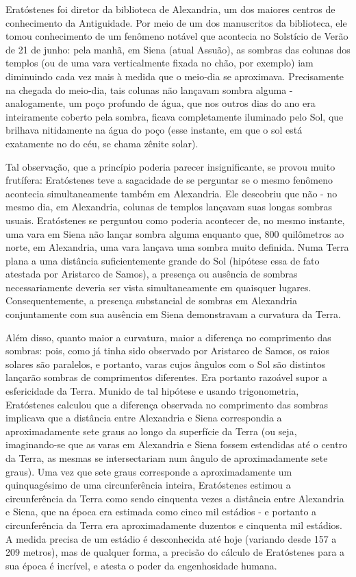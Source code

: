 Eratóstenes foi diretor da biblioteca de Alexandria, um dos maiores centros de conhecimento da Antiguidade. Por meio de um dos manuscritos da biblioteca, ele tomou conhecimento de um fenômeno notável que acontecia no Solstício de Verão de 21 de junho: pela manhã, em Siena (atual Assuão), as sombras das colunas dos templos (ou de uma vara verticalmente fixada no chão, por exemplo) iam diminuindo cada vez mais à medida que o meio-dia se aproximava. Precisamente na chegada do meio-dia, tais colunas não lançavam sombra alguma - analogamente, um poço profundo de água, que nos outros dias do ano era inteiramente coberto pela sombra, ficava completamente iluminado pelo Sol, que brilhava nitidamente na água do poço (esse instante, em que o sol está exatamente no  do céu, se chama zênite solar). \par 
Tal observação, que a princípio poderia parecer insignificante, se provou muito frutífera: Eratóstenes teve a sagacidade de se perguntar se o mesmo fenômeno acontecia simultaneamente também em Alexandria. Ele descobriu que não - no mesmo dia, em Alexandria, colunas de templos lançavam suas longas sombras usuais. Eratóstenes se perguntou como poderia acontecer de, no mesmo instante, uma vara em Siena não lançar sombra alguma enquanto que, 800 quilômetros ao norte, em Alexandria, uma vara lançava uma sombra muito definida. Numa Terra plana a uma distância suficientemente grande do Sol (hipótese essa de fato atestada por Aristarco de Samos), a presença ou ausência de sombras necessariamente deveria ser vista simultaneamente em quaisquer lugares. Consequentemente, a presença substancial de sombras em Alexandria conjuntamente com sua ausência em Siena demonstravam a curvatura da Terra. \par 
Além disso, quanto maior a curvatura, maior a diferença no comprimento das sombras: pois, como já tinha sido observado por Aristarco de Samos, os raios solares são paralelos, e portanto, varas cujos ângulos com o Sol são distintos lançarão sombras de comprimentos diferentes. Era portanto razoável supor a esfericidade da Terra. Munido de tal hipótese e usando trigonometria, Eratóstenes calculou que a diferença observada no comprimento das sombras implicava que a distância entre Alexandria e Siena correspondia a aproximadamente sete graus ao longo da superfície da Terra (ou seja, imaginando-se que as varas em Alexandria e Siena fossem estendidas até o centro da Terra, as mesmas se intersectariam num ângulo de aproximadamente sete graus). Uma vez que sete graus corresponde a aproximadamente um quinquagésimo de uma circunferência inteira, Eratóstenes estimou a circunferência da Terra como sendo cinquenta vezes a distância entre Alexandria e Siena, que na época era estimada como cinco mil estádios - e portanto a circunferência da Terra era aproximadamente duzentos e cinquenta mil estádios. A medida precisa de um estádio é desconhecida até hoje (variando desde 157 a 209 metros), mas de qualquer forma, a precisão do cálculo de Eratóstenes para a sua época é incrível, e atesta o poder da engenhosidade humana. \par 

